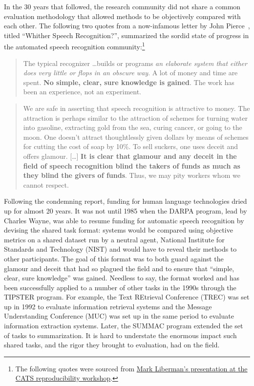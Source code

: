 In the 30 years that followed, the research community did not share a common evaluation methodology that allowed methods to be objectively compared with each other.
The following two quotes from a now-infamous letter by John Pierce~\citep{pierce1970whither}, titled ``Whither Speech Recognition?'', summarized the sordid state of progress in the automated speech recognition community:\footnote{%
The following quotes were sourced from \href{https://pdfs.semanticscholar.org/presentation/b719/c67e53c008c68e8978c2e97643cf131bb61c.pdf}{Mark Liberman's presentation at the CATS reproducibility workshop}.
}

\begin{quote}
  The typical recognizer \dots builds or programs \textit{an elaborate system that either does very little or flops in an obscure way}. A lot of money and time are spent. \textbf{No simple, clear, sure knowledge is gained}. The work has been an experience, not an experiment.
\end{quote}
\begin{quote}
We are safe in asserting that speech recognition is attractive to money. The attraction is perhaps similar to the attraction of schemes for turning water into gasoline, extracting gold from the sea, curing cancer, or going to the moon. 
One doesn't attract thoughtlessly given dollars by means of schemes for cutting the cost of soap by 10\%.
To sell suckers, one uses deceit and offers glamour. [\dots] \textbf{It is clear that glamour and any deceit in the field of speech recognition blind the takers of funds as much as they blind the givers of funds}. Thus, we may pity workers whom we cannot respect.
\end{quote}

Following the condemning report, funding for human language technologies dried up for almost 20 years.
It was not until 1985 when the DARPA program, lead by Charles Wayne, was able to resume funding for automatic speech recognition by devising the shared task format: systems would be compared using objective metrics on a shared dataset run by a neutral agent, National Institute for Standards and Technology (NIST) and would have to reveal their methods to other participants.
The goal of this format was to both guard against the glamour and deceit that had so plagued the field and to ensure that ``simple, clear, sure knowledge'' was gained.
Needless to say, the format worked and has been successfully applied to a number of other tasks in the 1990s through the TIPSTER program.
For example, the Text REtrieval Conference (TREC) was set up in 1992 to evaluate information retrieval systems and the Message Understanding Conference (MUC) was set up in the same period to evaluate information extraction systems.
Later, the SUMMAC program extended the set of tasks to summarization.
It is hard to understate the enormous impact such shared tasks, and the rigor they brought to evaluation, had on the field.

